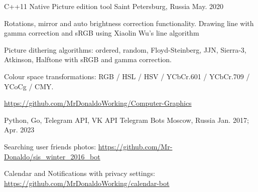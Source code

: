 

\begin{cventries}

  \cventry
    {C++11 Native}%
    {Picture edition tool} %
    {Saint Petersburg, Russia} %
    {May. 2020} %
    {
      \begin{cvitems} %
        \item {Rotations, mirror and auto brightness correction functionality. Drawing line with gamma correction and sRGB using Xiaolin Wu's line algorithm}
        \item {Picture dithering algorithms: ordered, random, Floyd-Steinberg, JJN, Sierra-3, Atkinson, Halftone with sRGB and gamma correction.}
        \item {Colour space transformations: RGB / HSL / HSV / YCbCr.601 / YCbCr.709 / YCoCg / CMY.}
        \item {\url{https://github.com/MrDonaldoWorking/Computer-Graphics}}
      \end{cvitems}
    }

  \cventry
    {Python, Go, Telegram API, VK API} %
    {Telegram Bots} %
    {Moscow, Russia} %
    {Jan. 2017; Apr. 2023} %
    {
      \begin{cvitems} %
        \item {Searching user friends photos: \url{https://github.com/Mr-Donaldo/sis_winter_2016_bot}}
        \item {Calendar and Notifications with privacy settings: \url{https://github.com/MrDonaldoWorking/calendar-bot}}
      \end{cvitems}
    }



\end{cventries}
